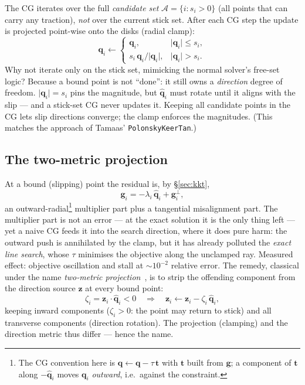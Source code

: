 \documentclass[11pt,a4paper]{article}
\newcommand{\bq}{\mathbf{q}}
\newcommand{\bg}{\mathbf{g}}
\newcommand{\bt}{\mathbf{t}}
\newcommand{\bz}{\mathbf{z}}
\newcommand{\qhat}{\hat{\bq}}
\newcommand{\abs}[1]{\lvert#1\rvert}
\newcommand{\code}[1]{\texttt{#1}}
\begin{document}
The CG iterates over the full \emph{candidate set}
$\mathcal A = \{ i : s_i > 0 \}$ (all points that can carry any traction),
\emph{not} over the current stick set. After each CG step the update is
projected point-wise onto the disks (radial clamp):
\begin{equation}
  \bq_i \leftarrow
  \begin{cases}
    \bq_i, & \abs{\bq_i} \le s_i,\\[2pt]
    s_i\, \bq_i / \abs{\bq_i}, & \abs{\bq_i} > s_i .
  \end{cases}
\end{equation}
Why not iterate only on the stick set, mimicking the normal solver's
free-set logic? Because a bound point is not ``done'': it still owns a
\emph{direction} degree of freedom. $\abs{\bq_i} = s_i$ pins the magnitude,
but $\qhat_i$ must rotate until it aligns with the slip --- and a stick-set
CG never updates it. Keeping all candidate points in the CG lets slip
directions converge; the clamp enforces the magnitudes. (This matches the
approach of Tamaas' \code{PolonskyKeerTan}.)

\subsection{The two-metric projection}
\label{sec:twometric}

At a bound (slipping) point the residual is, by \S\ref{sec:kkt},
\begin{equation}
  \bg_i = -\lambda_i\, \qhat_i + \bg_i^{\perp},
\end{equation}
an outward-radial\footnote{The CG convention here is
$\bq \leftarrow \bq - \tau\, \bt$ with $\bt$ built from $\bg$; a component
of $\bt$ along $-\qhat_i$ moves $\bq_i$ \emph{outward}, i.e.\ against the
constraint.} multiplier part plus a tangential misalignment part. The
multiplier part is not an error --- at the exact solution it is the only
thing left --- yet a naive CG feeds it into the search direction, where it
does pure harm: the outward push is annihilated by the clamp, but it has
already polluted the \emph{exact line search}, whose $\tau$ minimises the
objective along the unclamped ray. Measured effect: objective oscillation
and stall at $\sim 10^{-2}$ relative error. The remedy, classical under the
name \emph{two-metric projection}~\cite{Bertsekas1982}, is to strip the
offending component from the direction source $\bz$ at every bound point:
\begin{equation}
  \zeta_i = \bz_i \cdot \qhat_i < 0
  \quad\Longrightarrow\quad
  \bz_i \leftarrow \bz_i - \zeta_i\, \qhat_i ,
\end{equation}
keeping inward components ($\zeta_i > 0$: the point may return to stick)
and all transverse components (direction rotation). The projection
(clamping) and the direction metric thus differ --- hence the name.
\end{document}
